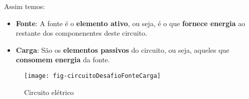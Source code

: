 \begin{minipage}{\linewidth}
  \centering
  \begin{minipage}{0.45\linewidth}
    Assim temos:
    \begin{itemize}
      \item \textbf{Fonte}: A fonte é o \textbf{elemento ativo}, ou seja, é o que \textbf{fornece energia} ao restante dos componenentes deste circuito.
      \item \textbf{Carga}: São os \textbf{elementos passivos} do circuito, ou seja, aqueles que \textbf{consomem energia} da fonte.
    \end{itemize}
  \end{minipage}
  \hspace{0.05\linewidth}
  \begin{minipage}{0.45\linewidth}
    \begin{figure}[H]
      \centering
      \caption{Circuito elétrico}
      \label{fig:CircuitoDesafioFonteCarga}
      \texttt{[image: fig-circuitoDesafioFonteCarga]}
%
    \end{figure}
  \end{minipage}
\end{minipage}
